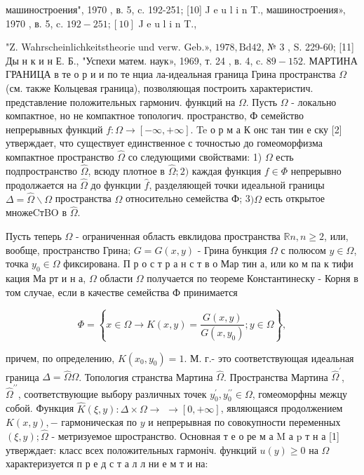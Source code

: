 \documentclass[10pt]{article}
\begin{document}
машиностроения", 1970 , в. 5, c. 192-251; [10] J e u l i n T., машиностроения», 1970 , в. 5, c. $192-251 ;[10]$ J e u l i n T.,

"Z. Wahrscheinlichkeitstheorie und verw. Geb.», $1978, \mathrm{Bd} 42$, № 3 , S. 229-60; [11] Ды н к и н Е. Б., "Успехи матем. наук», 1969, т. 24 , в. 4, c. $89-152$. МАРТИНА ГРАНИЦА в те о р и и по те нциа ла-идеальная граница Грина пространства $\Omega$ (см. также Кольцевая граница), позволяющая построить характеристич. представление положительных гармонич. функций на $\Omega$. Пусть $\Omega$ - локально компактное, но не компактное топологич. пространство, Ф семейство непрерывных функций $f: \Omega \rightarrow[-\infty,+\infty]$. Te о р м а $К$ онс тан тин е ску [2] утверждает, что существует единственное с точностью до гомеоморфизма компактное пространство $\widehat{\Omega}$ со следующими свойствами: 1) $\Omega$ есть подпространство $\widehat{\Omega}$, всюду плотное в $\widehat{\Omega} ; 2)$ каждая функция $f \in \Phi$ непрерывно продолжается на $\widehat{\Omega}$ до функции $\hat{f}$, разделяющей точки идеальной границы $\Delta=\widehat{\Omega} \backslash \Omega$ пространства $\Omega$ относительно семейства Ф; 3$) \Omega$ есть открытое множеCтBO в $\widehat{\Omega}$.



Пусть теперь $\Omega$ - ограниченная область евклидова пространства $\mathbb{R} n, n \geqslant 2$, или, вообще, пространство Грина; $G=G(x, y)$ - Грина бункция $\Omega$ с полюсом $y \in \Omega$, точка $y_{0} \in \Omega$ фиксирована. П р о с т р а н с т в о Мар тин а, или ко м па к тифи кация Ма рт и н а, $\Omega$ области $\Omega$ получается по теореме Константинеску - Корня в том случае, если в качестве семейства Ф принимается



\[

\Phi=\left\{x \in \Omega \rightarrow K(x, y)=\frac{G(x, y)}{G\left(x, y_{0}\right)} ; y \in \Omega\right\},

\]



причем, по определению, $K\left(x_{0}, y_{0}\right)=1$. М. г.- это соответствующая идеальная граница $\Delta=\hat{\Omega} \Omega$. Топология странства Мартина $\widehat{\Omega}$. Пространства Мартина $\widehat{\Omega}^{\prime}$, $\widehat{\Omega}^{\prime \prime}$, соответствующие выбору различных точек $y_{0}^{\prime}, y_{0}^{\prime \prime} \in \Omega$, гомеоморфны межцу собой. Функция $\widehat{K}(\xi, y): \Delta \times \Omega \rightarrow$ $\rightarrow[0,+\infty]$, являющаяся продолжением $K(x, y),-$ гармоническая по $y$ и непрерывная по совокупности переменных $(\xi, y) ; \widehat{\Omega}$ - метризуемое шространство. Основная т е о ре м а $\mathrm{M}$ а $\mathrm{p}$ т н а [1] утверждает: класс всех положительных гармоніч. функций $u(y) \geqslant 0$ на $\Omega$ характеризуется п р е д с т а л л ни е м т и на:
\end{document}
